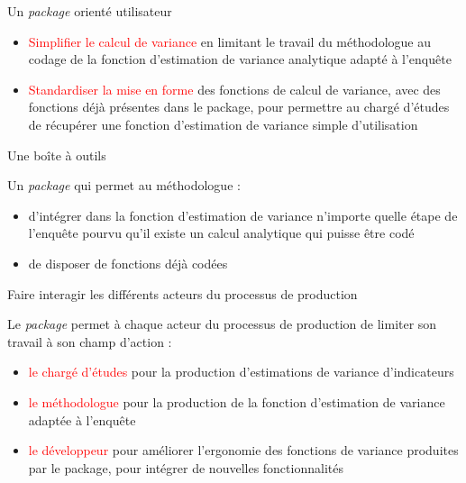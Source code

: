 \documentclass[xcolor=dvipsnames]{beamer}
\begin{document}
\begin{frame}{Un \textit{package} orienté utilisateur}

\begin{itemize}
    
    \item \textcolor{red}{Simplifier le calcul de variance} en limitant le travail du méthodologue au codage de la fonction d'estimation de variance analytique adapté à l'enquête
    
    \vspace{0.5 cm}
    
    \item \textcolor{red}{Standardiser la mise en forme} des fonctions de calcul de variance, avec des fonctions déjà présentes dans le package, pour permettre au chargé d'études de récupérer une fonction d'estimation de variance simple d'utilisation
    
\end{itemize}
    
\end{frame}

\begin{frame}{Une boîte à outils}

Un \textit{package} qui permet au méthodologue :

\vspace{0.5 cm}

\begin{itemize}
    
    \item d'intégrer dans la fonction d'estimation de variance n'importe quelle étape de l'enquête pourvu qu'il existe un calcul analytique qui puisse être codé
    \vspace{0.3 cm}
    \item de disposer de fonctions déjà codées

\end{itemize}
    
\end{frame}

\begin{frame}{Faire interagir les différents acteurs du processus de production}

Le \textit{package} permet à chaque acteur du processus de production de limiter son travail à son champ d'action :

\begin{itemize}
    \vspace{0.3 cm}
    \item \textcolor{red}{le chargé d'études} pour la production d'estimations de variance d'indicateurs
    \vspace{0.3 cm}
    \item \textcolor{red}{le méthodologue} pour la production de la fonction d'estimation de variance adaptée à l'enquête
    \vspace{0.3 cm}
    \item \textcolor{red}{le développeur} pour améliorer l'ergonomie des fonctions de variance produites par le package, pour intégrer de nouvelles fonctionnalités
\end{itemize}

\end{frame}
\end{document}
